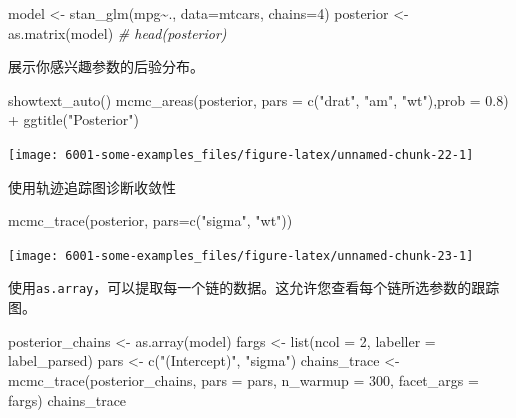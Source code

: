 \documentclass[
]{book}
\newenvironment{Shaded}{\begin{snugshade}}{\end{snugshade}}
\newcommand{\AttributeTok}[1]{\textcolor[rgb]{0.77,0.63,0.00}{#1}}
\newcommand{\CommentTok}[1]{\textcolor[rgb]{0.56,0.35,0.01}{\textit{#1}}}
\newcommand{\DecValTok}[1]{\textcolor[rgb]{0.00,0.00,0.81}{#1}}
\newcommand{\FloatTok}[1]{\textcolor[rgb]{0.00,0.00,0.81}{#1}}
\newcommand{\FunctionTok}[1]{\textcolor[rgb]{0.00,0.00,0.00}{#1}}
\newcommand{\NormalTok}[1]{#1}
\newcommand{\OtherTok}[1]{\textcolor[rgb]{0.56,0.35,0.01}{#1}}
\newcommand{\SpecialCharTok}[1]{\textcolor[rgb]{0.00,0.00,0.00}{#1}}
\newcommand{\StringTok}[1]{\textcolor[rgb]{0.31,0.60,0.02}{#1}}
\begin{document}
\begin{Shaded}
\begin{Highlighting}[]
\NormalTok{model }\OtherTok{\textless{}{-}} \FunctionTok{stan\_glm}\NormalTok{(mpg}\SpecialCharTok{\textasciitilde{}}\NormalTok{., }\AttributeTok{data=}\NormalTok{mtcars, }\AttributeTok{chains=}\DecValTok{4}\NormalTok{) }
\NormalTok{posterior }\OtherTok{\textless{}{-}} \FunctionTok{as.matrix}\NormalTok{(model)}
\CommentTok{\# head(posterior)}
\end{Highlighting}
\end{Shaded}

展示你感兴趣参数的后验分布。

\begin{Shaded}
\begin{Highlighting}[]
\FunctionTok{showtext\_auto}\NormalTok{() }
\FunctionTok{mcmc\_areas}\NormalTok{(posterior, }\AttributeTok{pars =} \FunctionTok{c}\NormalTok{(}\StringTok{"drat"}\NormalTok{, }\StringTok{"am"}\NormalTok{, }\StringTok{"wt"}\NormalTok{),}\AttributeTok{prob =} \FloatTok{0.8}\NormalTok{) }\SpecialCharTok{+} \FunctionTok{ggtitle}\NormalTok{(}\StringTok{"Posterior"}\NormalTok{)}
\end{Highlighting}
\end{Shaded}

\begin{center}\texttt{[image: 6001-some-examples\_files/figure-latex/unnamed-chunk-22-1]} \end{center}

使用轨迹追踪图诊断收敛性

\begin{Shaded}
\begin{Highlighting}[]
\FunctionTok{mcmc\_trace}\NormalTok{(posterior, }\AttributeTok{pars=}\FunctionTok{c}\NormalTok{(}\StringTok{"sigma"}\NormalTok{, }\StringTok{"wt"}\NormalTok{))}
\end{Highlighting}
\end{Shaded}

\begin{center}\texttt{[image: 6001-some-examples\_files/figure-latex/unnamed-chunk-23-1]} \end{center}

使用\texttt{as.array}，可以提取每一个链的数据。这允许您查看每个链所选参数的跟踪图。

\begin{Shaded}
\begin{Highlighting}[]
\NormalTok{posterior\_chains }\OtherTok{\textless{}{-}} \FunctionTok{as.array}\NormalTok{(model) }
\NormalTok{fargs }\OtherTok{\textless{}{-}} \FunctionTok{list}\NormalTok{(}\AttributeTok{ncol =} \DecValTok{2}\NormalTok{, }\AttributeTok{labeller =}\NormalTok{ label\_parsed) }
\NormalTok{pars }\OtherTok{\textless{}{-}} \FunctionTok{c}\NormalTok{(}\StringTok{"(Intercept)"}\NormalTok{, }\StringTok{"sigma"}\NormalTok{) }
\NormalTok{chains\_trace }\OtherTok{\textless{}{-}} \FunctionTok{mcmc\_trace}\NormalTok{(posterior\_chains, }\AttributeTok{pars =}\NormalTok{ pars, }\AttributeTok{n\_warmup =} \DecValTok{300}\NormalTok{, }\AttributeTok{facet\_args =}\NormalTok{ fargs)}
\NormalTok{chains\_trace}
\end{Highlighting}
\end{Shaded}
\end{document}
